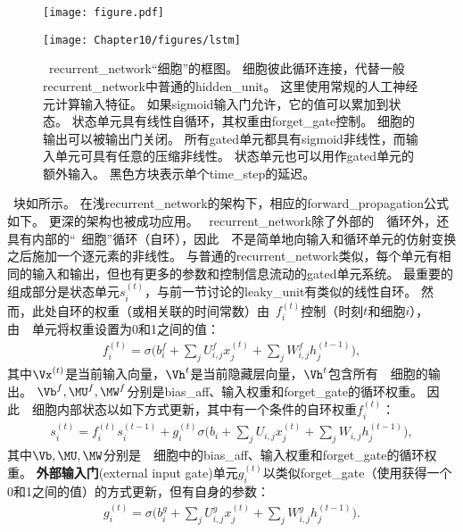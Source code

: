 
\begin{figure}[!htb]
\ifOpenSource
\centerline{\texttt{[image: figure.pdf]}}
\else
\centerline{\texttt{[image: Chapter10/figures/lstm]}}
\fi
\caption{~\gls{recurrent_network}``细胞''的框图。
细胞彼此循环连接，代替一般\gls{recurrent_network}中普通的\gls{hidden_unit}。
这里使用常规的人工神经元计算输入特征。
如果sigmoid输入门允许，它的值可以累加到状态。
状态单元具有线性自循环，其权重由\gls{forget_gate}控制。
细胞的输出可以被输出门关闭。
所有\gls{gated}单元都具有sigmoid非线性，而输入单元可具有任意的压缩非线性。
状态单元也可以用作\gls{gated}单元的额外输入。
黑色方块表示单个\gls{time_step}的延迟。
}
\label{fig:chap10_lstm}
\end{figure}

~块如所示。
在浅\gls{recurrent_network}的架构下，相应的\gls{forward_propagation}公式如下。
更深的架构也被成功应用\citep{Graves-et-al-ICASSP2013,Pascanu-et-al-ICLR2014}。
~\gls{recurrent_network}除了外部的~~循环外，还具有内部的``~细胞''循环（自环），因此~~不是简单地向输入和循环单元的仿射变换之后施加一个逐元素的非线性。
与普通的\gls{recurrent_network}类似，每个单元有相同的输入和输出，但也有更多的参数和控制信息流动的\gls{gated}单元系统。
最重要的组成部分是状态单元$s_i^{(t)}$，与前一节讨论的\gls{leaky_unit}有类似的线性自环。
然而，此处自环的权重（或相关联的时间常数）由~$f_i^{(t)}$控制（时刻$t$和细胞$i$），由~~单元将权重设置为0和1之间的值：
\begin{align}
 f_i^{(t)} = \sigma \Big( b_i^f + \sum_j U_{i,j}^f x_j^{(t)} + \sum_j W_{i,j}^f h_j^{(t-1)} \Big),
\end{align}
其中$\Vx^{(t)}$是当前输入向量，$\Vh^{t}$是当前隐藏层向量，$\Vh^{t}$包含所有~~细胞的输出。 
$\Vb^f, \MU^f, \MW^f$分别是\gls{bias_aff}、输入权重和\gls{forget_gate}的循环权重。
因此~~细胞内部状态以如下方式更新，其中有一个条件的自环权重$f_i^{(t)}$：
\begin{align}
 s_i^{(t)} = f_i^{(t)}  s_i^{(t-1)} +  g_i^{(t)}
 \sigma \Big( b_i + \sum_j U_{i,j} x_j^{(t)} + \sum_j W_{i,j} h_j^{(t-1)} \Big),
\end{align}
其中$\Vb, \MU, \MW$分别是~~细胞中的\gls{bias_aff}、输入权重和\gls{forget_gate}的循环权重。
\textbf{外部输入门}(external input gate)单元$g_i^{(t)}$以类似\gls{forget_gate}（使用获得一个0和1之间的值）的方式更新，但有自身的参数：
\begin{align}
 g_i^{(t)} = \sigma \Big( b_i^g + \sum_j U_{i,j}^g x_j^{(t)} + \sum_j W_{i,j}^g h_j^{(t-1)} \Big).
\end{align}
